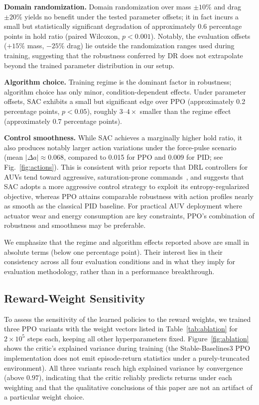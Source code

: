\documentclass[conference]{IEEEtran}
\begin{document}
\textbf{Domain randomization.} Domain randomization over mass $\pm 10\%$ and drag $\pm 20\%$ yields no benefit under the tested parameter offsets; it in fact incurs a small but statistically significant degradation of approximately 0.6 percentage points in hold ratio (paired Wilcoxon, $p < 0.001$). Notably, the evaluation offsets ($+15\%$ mass, $-25\%$ drag) lie outside the randomization ranges used during training, suggesting that the robustness conferred by DR does not extrapolate beyond the trained parameter distribution in our setup.

\textbf{Algorithm choice.} Training regime is the dominant factor in robustness; algorithm choice has only minor, condition-dependent effects. Under parameter offsets, SAC exhibits a small but significant edge over PPO (approximately 0.2 percentage points, $p < 0.05$), roughly $3$--$4\times$ smaller than the regime effect (approximately 0.7 percentage points).

\textbf{Control smoothness.} While SAC achieves a marginally higher hold ratio, it also produces notably larger action variations under the force-pulse scenario (mean $|\Delta a| \approx 0.068$, compared to 0.015 for PPO and 0.009 for PID; see Fig.~\ref{fig:actions}). This is consistent with prior reports that DRL controllers for AUVs tend toward aggressive, saturation-prone commands~\cite{du2023mrtd3}, and suggests that SAC adopts a more aggressive control strategy to exploit its entropy-regularized objective, whereas PPO attains comparable robustness with action profiles nearly as smooth as the classical PID baseline. For practical AUV deployment where actuator wear and energy consumption are key constraints, PPO's combination of robustness and smoothness may be preferable.

We emphasize that the regime and algorithm effects reported above are small in absolute terms (below one percentage point). Their interest lies in their consistency across all four evaluation conditions and in what they imply for evaluation methodology, rather than in a performance breakthrough.

\subsection{Reward-Weight Sensitivity}
To assess the sensitivity of the learned policies to the reward weights, we trained three PPO variants with the weight vectors listed in Table~\ref{tab:ablation} for $2\times10^5$ steps each, keeping all other hyperparameters fixed. Figure~\ref{fig:ablation} shows the critic's explained variance during training (the Stable-Baselines3 PPO implementation does not emit episode-return statistics under a purely-truncated environment). All three variants reach high explained variance by convergence (above $0.97$), indicating that the critic reliably predicts returns under each weighting and that the qualitative conclusions of this paper are not an artifact of a particular weight choice.
\end{document}

